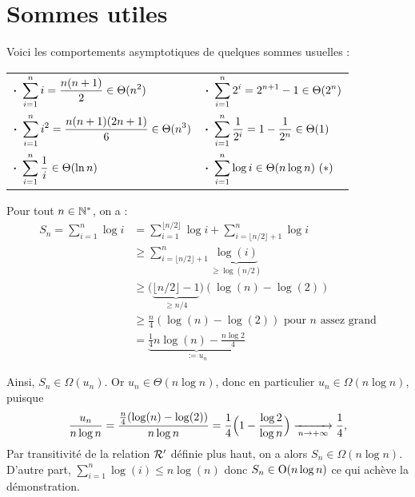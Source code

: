 \section{Sommes utiles}

	\setlength{\tabcolsep}{20pt}
	Voici les comportements asymptotiques de quelques sommes usuelles : \\[2mm] \hspace*{10mm} \begin{tabular}[t]{ll}
		\(\displaystyle \text{\bdot} \sum_{i=1}^n i = \frac{n(n+1)}{2} \in \Theta(n^2)\) & \(\text{\bdot} \displaystyle \sum_{i=1}^n 2^i = 2^{n+1}-1 \in \Theta(2^n)\) \\
		\(\text{\bdot} \displaystyle \sum_{i=1}^n i^2 = \frac{n(n+1)(2n+1)}{6} \in \Theta(n^3)\) & \(\text{\bdot} \displaystyle \sum_{i=1}^n \frac{1}{2^i} = 1 - \frac{1}{2^n} \in \Theta(1)\) \\
		\(\displaystyle \text{\bdot} \sum_{i=1}^n \frac{1}{i} \in \Theta(\ln n)\) & \(\text{\bdot} \displaystyle \sum_{i=1}^n \log i \in \Theta(n\log n) \ (*)\)
	\end{tabular} 
	\begin{Preuve}[$(*)$]
		Pour tout \(n \in \bb{N}^*\), on a :
			\begin{align*}
				S_n = \sum\nolimits_{i=1}^n \log i & = \sum\nolimits_{i=1}^{\lfloor n/2 \rfloor} \log i + \sum\nolimits_{i=\lfloor n/2 \rfloor+1}^n \log i \\[-0.5mm]
				& \geq \sum\nolimits_{i=\lfloor n/2 \rfloor+1}^n \underbrace{\log(i)}_{\geq \log(n/2)} \\[-1mm]
				& \geq \big(\underbrace{\lfloor n/2 \rfloor -1}_{\geq n/4}\big)(\log(n) - \log(2)) \\[-2mm]
				& \geq \frac{n}{4} (\log(n) - \log(2)) \text{ pour \(n\) assez grand} \\
				& = \underbrace{\frac{1}{4}n\log(n) - \frac{n\log 2}{4}}_{:= u_n}
			\end{align*}
		
		Ainsi, \(S_n \in \Omega(u_n)\). Or \(u_n \in \Theta(n \log n)\), donc en particulier \(u_n \in \Omega(n \log n) \), puisque
		\[
			\displaystyle \frac{u_n}{n\log n} = \frac{\frac{n}{4} (\log(n) - \log(2))}{n\log n} = \frac{1}{4}\Big(1 - \frac{\log 2}{\log n} \Big) \ntoinf \frac{1}{4},
		\]
		Par transitivité de la relation \(\cal{R}'\) définie plus haut, on a alors \(S_n \in \Omega(n \log n)\). \\[2mm]
		D'autre part, \(\displaystyle \sum\nolimits_{i=1}^n \log(i) \leq n \log(n)\) donc \(S_n \in \rm{O}(n\log n)\) ce qui achève la démonstration.
	\end{Preuve}

